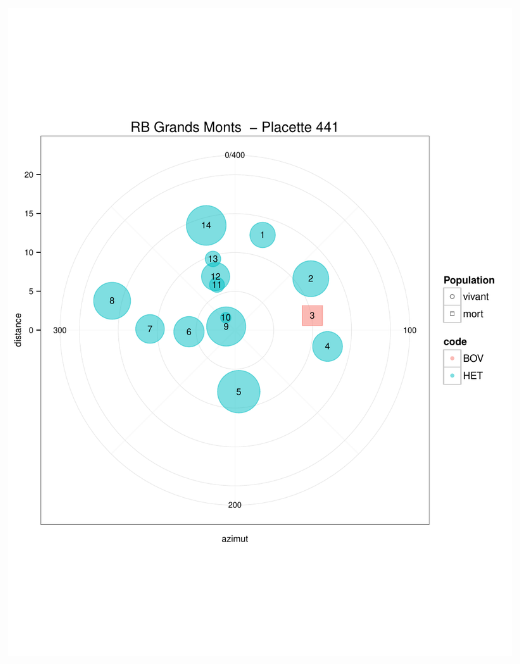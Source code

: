 \documentclass[a4paper]{book}\usepackage[]{graphicx}\usepackage[]{color}
\makeatletter
\def\maxwidth{ %
  \ifdim\Gin@nat@width>\linewidth
    \linewidth
  \else
    \Gin@nat@width
  \fi
}
\newenvironment{knitrout}{}{} %
\makeatother
\begin{document}
\begin{knitrout}
{\centering \includegraphics[width=\maxwidth]{Figures/PlanArbres-44} 

}





\end{knitrout}
\end{document}
